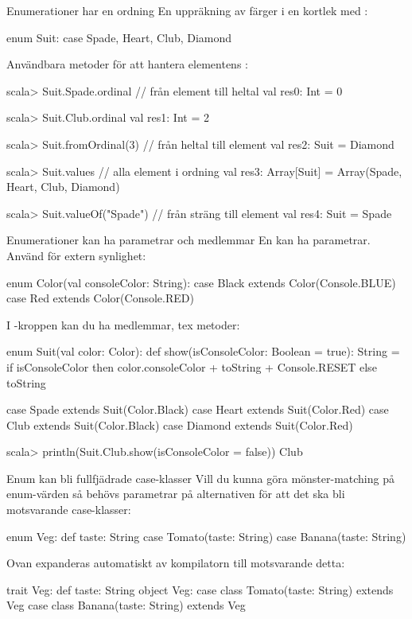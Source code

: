 

\SlideFontSmall
\begin{Slide}{Enumerationer har en ordning}
En uppräkning av färger i en kortlek med :
\begin{Code}
enum Suit:
  case Spade, Heart, Club, Diamond 
\end{Code}
Användbara metoder för att hantera elementens :
\begin{REPLsmall}
scala> Suit.Spade.ordinal      // från element till heltal
val res0: Int = 0

scala> Suit.Club.ordinal
val res1: Int = 2

scala> Suit.fromOrdinal(3)    // från heltal till element
val res2: Suit = Diamond

scala> Suit.values            // alla element i ordning
val res3: Array[Suit] = Array(Spade, Heart, Club, Diamond)

scala> Suit.valueOf("Spade")  // från sträng till element
val res4: Suit = Spade
\end{REPLsmall}
\end{Slide}

\begin{Slide}{Enumerationer kan ha parametrar och medlemmar}
En  kan ha parametrar. Använd  för extern synlighet:  
\begin{Code}
enum Color(val consoleColor: String): 
  case Black extends Color(Console.BLUE)
  case Red   extends Color(Console.RED)
\end{Code}
I -kroppen kan du ha medlemmar, tex metoder:
\begin{Code}
enum Suit(val color: Color):
  def show(isConsoleColor: Boolean = true): String = 
    if isConsoleColor then color.consoleColor + toString + Console.RESET
    else toString

  case Spade   extends Suit(Color.Black)
  case Heart   extends Suit(Color.Red)
  case Club    extends Suit(Color.Black) 
  case Diamond extends Suit(Color.Red)
\end{Code}
\begin{REPLsmall}
scala> println(Suit.Club.show(isConsoleColor = false)) 
Club
\end{REPLsmall}
\end{Slide}

\begin{Slide}{Enum kan bli fullfjädrade case-klasser}
Vill du kunna göra mönster-matching på enum-värden så behövs parametrar på alternativen för att det ska bli motsvarande case-klasser: 
\begin{Code}
enum Veg:
  def taste: String
  case Tomato(taste: String)
  case Banana(taste: String)
\end{Code}
Ovan expanderas automatiskt av kompilatorn till motsvarande detta:
\begin{Code}
trait Veg:
  def taste: String
object Veg:
  case class Tomato(taste: String) extends Veg
  case class Banana(taste: String) extends Veg
\end{Code}
\end{Slide}

